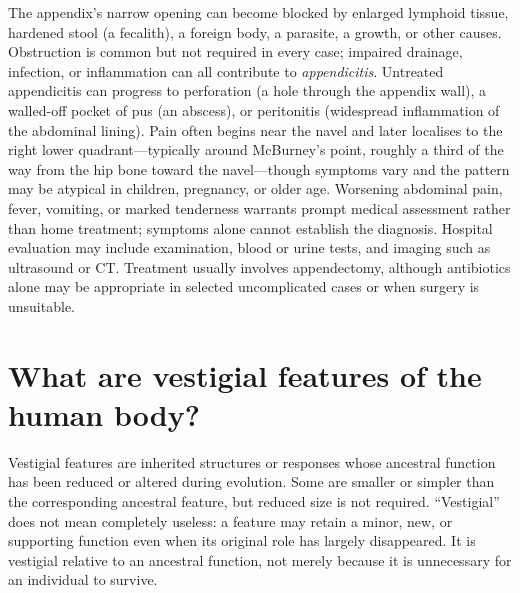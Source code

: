 \documentclass[11pt,oneside]{report}
\begin{document}
The appendix's narrow opening can become blocked by enlarged lymphoid tissue,
hardened stool (a fecalith), a foreign body, a parasite, a growth, or other
causes. Obstruction is common but not required in every case; impaired drainage,
infection, or inflammation can all contribute to \emph{appendicitis}. Untreated
appendicitis can progress to perforation (a hole through the appendix wall), a
walled-off pocket of pus (an abscess), or peritonitis (widespread inflammation
of the abdominal lining). Pain often begins near the navel and later localises
to the right lower quadrant—typically around McBurney's point, roughly a third
of the way from the hip bone toward the navel—though symptoms vary and the
pattern may be atypical in children, pregnancy, or older age. Worsening
abdominal pain, fever, vomiting, or marked tenderness warrants prompt medical
assessment rather than home treatment; symptoms alone cannot establish the
diagnosis. Hospital evaluation may include examination, blood or urine tests,
and imaging such as ultrasound or CT. Treatment
usually involves appendectomy, although antibiotics alone may be appropriate in
selected uncomplicated cases or when surgery is unsuitable.

\section{What are vestigial features of the human body?}

Vestigial features are inherited structures or responses whose ancestral
function has been reduced or altered during evolution. Some are smaller or
simpler than the corresponding ancestral feature, but reduced size is not
required. ``Vestigial'' does not mean completely useless: a feature may retain
a minor, new, or supporting function even when its original role has largely
disappeared. It is vestigial relative to an ancestral function, not merely
because it is unnecessary for an individual to survive.
\end{document}
